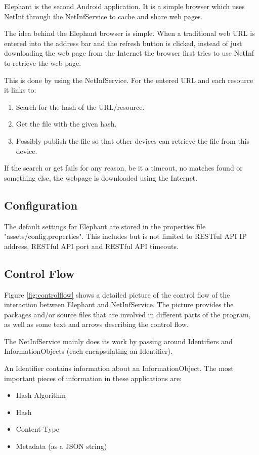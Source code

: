Elephant is the second Android application. It is a simple browser which uses NetInf through the NetInfService to cache and share web pages.

The idea behind the Elephant browser is simple. When a traditional web URL is entered into the address bar and the refresh button is clicked, instead of just downloading the web page from the Internet the browser first tries to use NetInf to retrieve the web page.

This is done by using the NetInfService. For the entered URL and each resource it links to:
\begin{enumerate}
	\item Search for the hash of the URL/resource.
	\item Get the file with the given hash.
	\item Possibly publish the file so that other devices can retrieve the file from this device.
\end{enumerate}

If the search or get fails for any reason, be it a timeout, no matches found or something else, the webpage is downloaded using the Internet.

\subsection{Configuration}
\label{sec:ConfigurationElephant}

The default settings for Elephant are stored in the properties file "assets/config.properties". This includes but is not limited to RESTful API IP address, RESTful API port and RESTful API timeouts.

\subsection{Control Flow}
\label{sec:Control Flow}

Figure \ref{fig:controlflow} shows a detailed picture of the control flow of the interaction between Elephant and NetInfService. The picture provides the packages and/or source files that are involved in different parts of the program, as well as some text and arrows describing the control flow.

The NetInfService mainly does its work by passing around Identifiers and InformationObjects (each encapsulating an Identifier).

An Identifier contains information about an InformationObject. The most important pieces of information in these applications are:
\begin{itemize}
\item Hash Algorithm
\item Hash
\item Content-Type
\item Metadata (as a JSON string)
\end{itemize}

